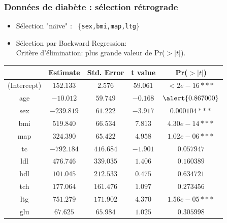 \begin{frame}
\frametitle{Données de diabète : sélection rétrograde}

\begin{itemize}
\item \alert{Sélection "na\"{\i}ve"} : \
\{\texttt{sex,bmi,map,ltg}\}
\item \alert{Sélection par Backward Regression}:\\
 \alert{Critère
d'élimination: plus grande valeur de} Pr($>|t|$).
\end{itemize}


{\small
\begin{tabular}{|c||c|c|c|c|}
\hline &Estimate&Std. Error&t value&Pr($>|t|$)\\\hline
(Intercept) &$152.133$&$2.576$&$59.061$&$< 2e-16***$\\
\alert{age}&$-10.012$&$59.749$&$
-0.168$&$\alert{0.867000}$\\\hline
sex &$-239.819$&$61.222$&$-3.917$&$0.000104***$\\
bmi&$519.840$&$66.534$&$7.813$&$4.30e-14***$\\\hline
map&$324.390$&$65.422$&$4.958$&$1.02e-06***$\\
tc&$-792.184$&$416.684$&$-1.901$&$0.057947$\\\hline
ldl&$476.746$&$339.035$&$1.406$&$0.160389$\\
hdl&$101.045$&$212.533 $&$0.475$&$0.634721$\\\hline
tch&$177.064$&$161.476$&$ 1.097$&$0.273456$\\
ltg&$751.279$&$ 171.902$&$4.370$&$ 1.56e-05***$\\\hline
glu&$67.625$&$ 65.984$&$1.025$&$0.305998$\\\hline
\end{tabular}
}
\end{frame}

